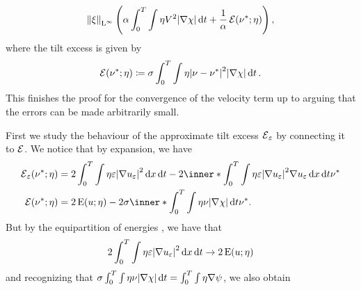 \begin{equation*}
	\norm{ \xi }_{ \lp^{ \infty } }
	\left(
		\alpha
	\int_{ 0 }^{ T }
	\int
	\eta
	V^{ 2 }
	\abs{ \nabla \chi }
	\dd{ t }
	+
		\frac{ 1 }{ \alpha }
		\tilt_excess ( \nu^{ \ast }; \eta )
	\right),
\end{equation*}
where the tilt excess is given by 
\begin{equation*}
	\tilt_excess ( \nu^{ \ast } ; \eta )
	\coloneqq
	\sigma
	\int_{ 0 }^{ T }
		\int
			\eta
			\abs{ \nu - \nu^{ \ast } }^{ 2 }
		\abs{ \nabla \chi }
	\dd{ t }.
\end{equation*}
This finishes the proof for the convergence of the velocity term up to arguing that the errors can be made arbitrarily small.

First we study the behaviour of the approximate tilt excess $ \tilt_excess_{ \varepsilon } $ by connecting it to $ \tilt_excess $. We notice that by expansion, we have
\begin{align*}
	\tilt_excess_{ \varepsilon } ( \nu^{ \ast } ; \eta )
	& =
	2
	\int_{ 0 }^{ T }
		\int
			\eta
			\varepsilon 
			\abs{ \nabla u_{ \varepsilon } }^{ 2 }
		\dd{ x }
	\dd{ t }
	-
	2 
	\inner*{\int_{ 0 }^{ T }
		\int
			\eta
			\varepsilon
			\abs{ \nabla u_{ \varepsilon } }^{ 2 }
			\nabla u_{ \varepsilon }
		\dd{ x }
	\dd{ t } }
	{ \nu^{ \ast } }
	\\
	\tilt_excess ( \nu^{ \ast } ; \eta )
	& =
	2 \energy ( u ; \eta )
	-
	2 \sigma
	\inner*{
		\int_{ 0 }^{ T }
			\int
				\eta
				\nu 
			\abs{ \nabla \chi }
		\dd{ t }
	}{ \nu^{ \ast } }.
\end{align*}
But by the equipartition of energies , we have that
\begin{equation*}
	2 \int_{ 0 }^{ T }
		\int
			\eta \varepsilon 
			\abs{ \nabla u_{ \varepsilon } }^{ 2 }
		\dd{ x }
	\dd{ t }
	\to 
	2 \operatorname{E} ( u ; \eta )
\end{equation*} 
and recognizing that $ \sigma \int_{0 }^{ T } \int \eta \nu \abs{ \nabla \chi } \dd{ t } = \int_{ 0 }^{ T } \int \eta \nabla \psi $, we also obtain
